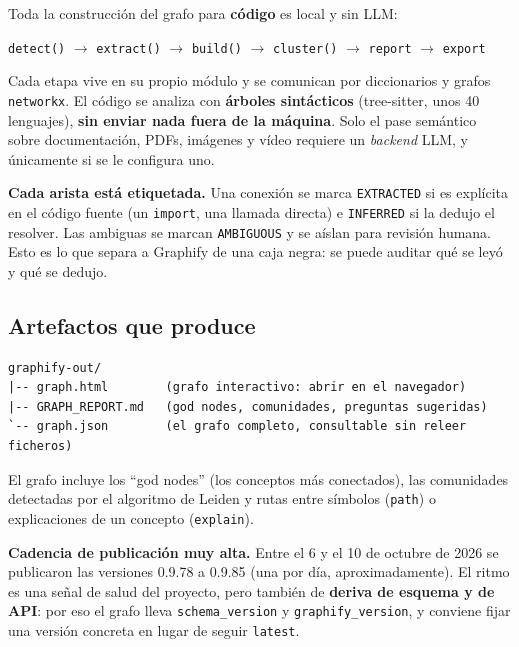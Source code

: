 \documentclass[11pt,a4paper]{article}
\begin{document}
Toda la construcción del grafo para \textbf{código} es local y sin LLM:

\begin{center}
\texttt{detect()} \(\rightarrow\) \texttt{extract()} \(\rightarrow\) \texttt{build()}
\(\rightarrow\) \texttt{cluster()} \(\rightarrow\) \texttt{report} \(\rightarrow\)
\texttt{export}
\end{center}

Cada etapa vive en su propio módulo y se comunican por diccionarios y grafos
\texttt{networkx}. El código se analiza con \textbf{árboles sintácticos} (tree-sitter,
unos 40 lenguajes), \textbf{sin enviar nada fuera de la máquina}. Solo el pase semántico
sobre documentación, PDFs, imágenes y vídeo requiere un \emph{backend} LLM, y únicamente
si se le configura uno.

\begin{cajaConcepto}
\textbf{Cada arista está etiquetada.} Una conexión se marca \texttt{EXTRACTED} si es
explícita en el código fuente (un \texttt{import}, una llamada directa) e
\texttt{INFERRED} si la dedujo el resolver. Las ambiguas se marcan \texttt{AMBIGUOUS} y
se aíslan para revisión humana. Esto es lo que separa a Graphify de una caja negra: se
puede auditar qué se leyó y qué se dedujo.
\end{cajaConcepto}

\subsection{Artefactos que produce}

\begin{lstlisting}
graphify-out/
|-- graph.html        (grafo interactivo: abrir en el navegador)
|-- GRAPH_REPORT.md   (god nodes, comunidades, preguntas sugeridas)
`-- graph.json        (el grafo completo, consultable sin releer ficheros)
\end{lstlisting}

El grafo incluye los ``god nodes'' (los conceptos más conectados), las comunidades
detectadas por el algoritmo de Leiden y rutas entre símbolos (\texttt{path}) o
explicaciones de un concepto (\texttt{explain}).

\begin{tcolorbox}[cajaMejora, title={\faIcon{exclamation-triangle}~Aviso de deriva (\emph{churn})}]
\textbf{Cadencia de publicación muy alta.} Entre el 6 y el 10 de octubre de 2026 se
publicaron las versiones 0.9.78 a 0.9.85 (una por día, aproximadamente). El ritmo es una
señal de salud del proyecto, pero también de \textbf{deriva de esquema y de API}: por eso
el grafo lleva \texttt{schema\_version} y \texttt{graphify\_version}, y conviene fijar una
versión concreta en lugar de seguir \texttt{latest}.
\end{tcolorbox}
\end{document}

